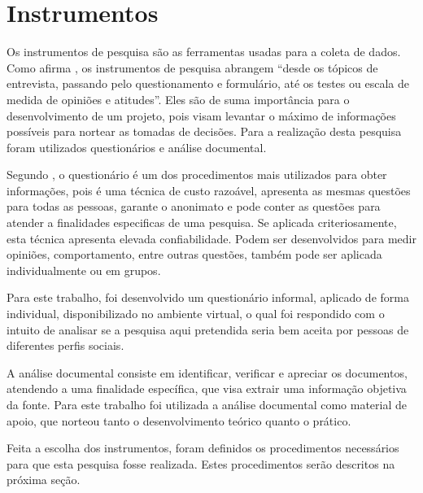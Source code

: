 \section{Instrumentos}

\par Os instrumentos de pesquisa são as ferramentas usadas para a coleta de dados. Como afirma , os instrumentos de pesquisa abrangem “desde os tópicos de entrevista, passando pelo questionamento e formulário, até os testes ou escala de medida de opiniões e atitudes”. Eles são de suma importância para o desenvolvimento de um projeto, pois visam levantar o máximo de informações possíveis para nortear as tomadas de decisões. Para a realização desta pesquisa foram utilizados questionários e análise documental.

\par Segundo , o questionário é um dos procedimentos mais utilizados para obter informações, pois é uma técnica de custo razoável, apresenta as mesmas questões para todas as pessoas, garante o anonimato e pode conter as questões para atender a finalidades especificas de uma pesquisa. Se aplicada criteriosamente, esta técnica apresenta elevada confiabilidade. Podem ser desenvolvidos para medir opiniões, comportamento, entre outras questões, também pode ser aplicada individualmente ou em grupos.

\par Para este trabalho, foi desenvolvido um questionário informal, aplicado de forma individual, disponibilizado no ambiente virtual, o qual foi respondido com o intuito de analisar se a pesquisa aqui pretendida seria bem aceita por pessoas de diferentes perfis sociais. %


\par A análise documental consiste em identificar, verificar e apreciar os documentos, atendendo a uma finalidade específica, que visa extrair uma informação objetiva da fonte. Para este trabalho foi utilizada a análise documental como material de apoio, que norteou tanto o desenvolvimento teórico quanto o prático.

\par Feita a escolha dos instrumentos, foram definidos os procedimentos necessários para que esta pesquisa fosse realizada. Estes procedimentos serão descritos na próxima seção.


